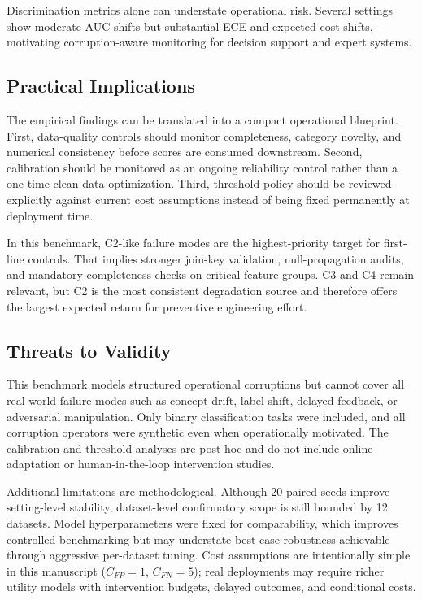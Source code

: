 \documentclass{AuthorGuide/ijitcs}
\begin{document}
Discrimination metrics alone can understate operational risk. Several settings show moderate AUC shifts but substantial ECE and expected-cost shifts, motivating corruption-aware monitoring for decision support and expert systems.

\subsection{Practical Implications}
The empirical findings can be translated into a compact operational blueprint. First, data-quality controls should monitor completeness, category novelty, and numerical consistency before scores are consumed downstream. Second, calibration should be monitored as an ongoing reliability control rather than a one-time clean-data optimization. Third, threshold policy should be reviewed explicitly against current cost assumptions instead of being fixed permanently at deployment time.

In this benchmark, C2-like failure modes are the highest-priority target for first-line controls. That implies stronger join-key validation, null-propagation audits, and mandatory completeness checks on critical feature groups. C3 and C4 remain relevant, but C2 is the most consistent degradation source and therefore offers the largest expected return for preventive engineering effort.

\subsection{Threats to Validity}
This benchmark models structured operational corruptions but cannot cover all real-world failure modes such as concept drift, label shift, delayed feedback, or adversarial manipulation. Only binary classification tasks were included, and all corruption operators were synthetic even when operationally motivated. The calibration and threshold analyses are post hoc and do not include online adaptation or human-in-the-loop intervention studies.

Additional limitations are methodological. Although 20 paired seeds improve setting-level stability, dataset-level confirmatory scope is still bounded by 12 datasets. Model hyperparameters were fixed for comparability, which improves controlled benchmarking but may understate best-case robustness achievable through aggressive per-dataset tuning. Cost assumptions are intentionally simple in this manuscript ($C_{FP}=1$, $C_{FN}=5$); real deployments may require richer utility models with intervention budgets, delayed outcomes, and conditional costs.
\end{document}

